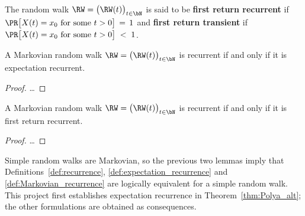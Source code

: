 \begin{definition}%
  \label{def:Markovian_recurrence}
  The random walk $\RW = \big(\RW(t)\big)_{t \in \bN}$
  is said to be \textbf{first return recurrent} if
  $\PR\big[ X(t) = x_0 \text{ for some } t > 0 \big] \, = \, 1$
  and \textbf{first return transient} if
  $\PR\big[ X(t) = x_0 \text{ for some } t > 0 \big] \; < \; 1$.
\end{definition}

\begin{lemma}
  \label{lem:recurrent_iff_expectation_recurrent}
  A Markovian random walk $\RW = \big(\RW(t)\big)_{t \in \bN}$ is recurrent
  if and only if it is
  expectation recurrent.
\end{lemma}
\begin{proof}
\ldots
\end{proof}

\begin{lemma}
  \label{lem:recurrent_iff_return_recurrent}
  A Markovian random walk $\RW = \big(\RW(t)\big)_{t \in \bN}$ is recurrent
  if and only if it is
  first return recurrent.
\end{lemma}
\begin{proof}
\ldots
\end{proof}

Simple random walks are Markovian, so the previous two lemmas imply that
Definitions~\ref{def:recurrence},
\ref{def:expectation_recurrence} and \ref{def:Markovian_recurrence} are logically
equivalent for a simple random walk.
This project first establishes expectation recurrence
in Theorem~\ref{thm:Polya_alt}; the other
formulations are obtained as consequences.
